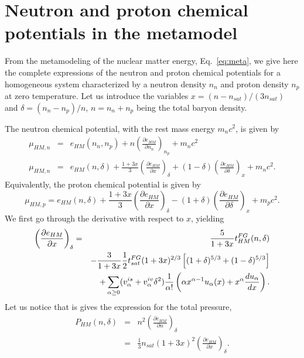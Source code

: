 \chapter{Neutron and proton chemical potentials in the 
metamodel}\label{appendix:mutau}

From the metamodeling of the nuclear matter energy, Eq.~\ref{eq:meta}, we give 
here the complete expressions of the neutron and proton chemical potentials
for a homogeneous system characterized by a neutron density $n_n$ and proton
density $n_p$ at zero temperature. Let us introduce the variables 
$x=(n-n_{sat})/(3n_{sat})$ and $\delta = (n_n - n_p)/n$, $n=n_n+n_p$ being the
total baryon density.

The neutron chemical potential, with the rest mass energy $m_nc^2$, is given by
%
\begin{eqnarray}
  \mu_{HM,n} &=& e_{HM}(n_n,n_p) + n\left(\frac{\partial
  e_{HM}}{\partial n_n}\right)_{n_p} + m_nc^2\\
  \mu_{HM,n} &=& e_{HM}(n,\delta) + \frac{1+3x}{3}\left(\frac{\partial
  e_{HM}}{\partial x}\right)_\delta + (1 - \delta)\left(\frac{\partial
e_{HM}}{\partial \delta}\right)_x + m_n c^2.
\end{eqnarray}
%
Equivalently, the proton chemical potential is given by
%
\begin{equation}
  \mu_{HM,p} = e_{HM}(n,\delta) + \frac{1+3x}{3}\left(\frac{\partial
  e_{HM}}{\partial x}\right)_\delta - (1 + \delta)\left(\frac{\partial
e_{HM}}{\partial \delta}\right)_x + m_p c^2.
\end{equation}
%
We first go through the derivative with respect to $x$, yielding
%
\begin{eqnarray}
  \left(\frac{\partial e_{HM}}{\partial x}\right)_\delta &=&  
  \frac{5}{1+3x}t_{HM}^{FG}(n,\delta) \notag\\
                                                         &&-
  \frac{3}{1+3x}\frac{1}{2}t_{sat}^{FG}(1+3x)^{2/3}
  \left[(1+\delta)^{5/3}+(1-\delta)^{5/3}\right]\notag\\
                                                         &&+
  \sum_{\alpha \geq 0}
  (v_\alpha^{is} + v_\alpha^{iv}\delta^2)\frac{1}{\alpha!}\left(\alpha
  x^{\alpha-1}u_\alpha(x) + x^\alpha \frac{du_\alpha}{dx}\right).
\end{eqnarray}
%
Let us notice that is gives the expression for the total pressure,
%
\begin{eqnarray}
  P_{HM}(n,\delta) &=& n^2\left(\frac{\partial e_{HM}}{\partial
  n}\right)_\delta\\
  &=& \frac{1}{3}n_{sat}(1+3x)^2\left(\frac{\partial e_{HM}}{\partial
  x}\right)_\delta.
\end{eqnarray}
